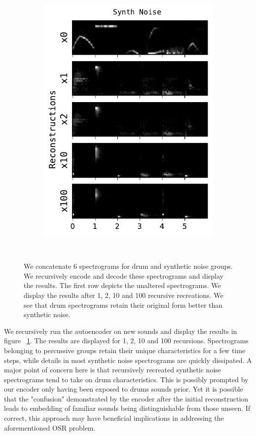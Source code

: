 \documentclass[\main/thesis.tex]{subfiles}
\begin{document}
\begin{figure}[h!]
{\begin{subfigure}[b]{.6\textwidth}
\includegraphics[width=.95\textwidth]{images/chapter_3/Synth Noise_reacreation.pdf}
\end{subfigure}%
}\\
\caption{We concatenate 6 spectrograms for drum and synthetic noise groups. We recursively encode and decode these spectrograms and display the results. The first row depicts the unaltered spectrograms. We display the results after 1, 2, 10 and 100 recursive recreations. We see that drum spectrograms retain their original form better than synthetic noise.}
\label{fig:recreations}
\end{figure}

We recursively run the autoencoder on new sounds and display the results in figure ~\ref{fig:recreations}. The results are displayed for 1, 2, 10 and 100 recursions. Spectrograms belonging to percussive groups retain their unique characteristics for a few time steps, while details in most synthetic noise spectrograms are quickly dissipated. A major point of concern here is that recursively recreated synthetic noise spectrograms tend to take on drum characteristics. This is possibly prompted by our encoder only having been exposed to drums sounds prior.  Yet it is possible that the "confusion" demonstrated by the encoder after the initial reconstruction leads to embedding of familiar sounds being distinguishable from those unseen. If correct, this approach may have beneficial implications in addressing the aforementioned OSR problem.  
\end{document}
